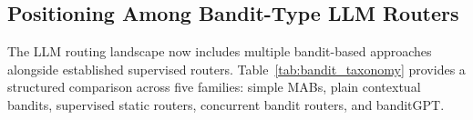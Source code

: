 
\subsection{Positioning Among Bandit-Type LLM Routers}
\label{appendix:positioning}

The LLM routing landscape now includes multiple bandit-based approaches alongside
established supervised routers.
Table~\ref{tab:bandit_taxonomy} provides a structured comparison across five
families: simple MABs, plain contextual bandits, supervised static routers,
concurrent bandit routers, and banditGPT.


